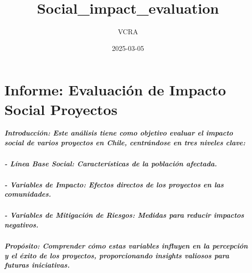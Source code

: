 \documentclass[
]{article}
\title{Social\_impact\_evaluation}
\author{VCRA}
\date{2025-03-05}
\begin{document}
\maketitle

\section{\texorpdfstring{\textbf{Informe: Evaluación de Impacto Social
Proyectos}}{Informe: Evaluación de Impacto Social Proyectos}}\label{informe-evaluaciuxf3n-de-impacto-social-proyectos}

\subparagraph{\texorpdfstring{\textbf{Introducción}: Este análisis tiene
como objetivo evaluar el impacto social de varios proyectos en Chile,
centrándose en tres niveles
clave:}{Introducción: Este análisis tiene como objetivo evaluar el impacto social de varios proyectos en Chile, centrándose en tres niveles clave:}}\label{introducciuxf3n-este-anuxe1lisis-tiene-como-objetivo-evaluar-el-impacto-social-de-varios-proyectos-en-chile-centruxe1ndose-en-tres-niveles-clave}

\subparagraph{\texorpdfstring{- \textbf{Línea Base Social}:
Características de la población
afectada.}{- Línea Base Social: Características de la población afectada.}}\label{luxednea-base-social-caracteruxedsticas-de-la-poblaciuxf3n-afectada.}

\subparagraph{\texorpdfstring{- \textbf{Variables de Impacto}: Efectos
directos de los proyectos en las
comunidades.}{- Variables de Impacto: Efectos directos de los proyectos en las comunidades.}}\label{variables-de-impacto-efectos-directos-de-los-proyectos-en-las-comunidades.}

\subparagraph{\texorpdfstring{- \textbf{Variables de Mitigación de
Riesgos}: Medidas para reducir impactos
negativos.}{- Variables de Mitigación de Riesgos: Medidas para reducir impactos negativos.}}\label{variables-de-mitigaciuxf3n-de-riesgos-medidas-para-reducir-impactos-negativos.}

\subparagraph{\texorpdfstring{\textbf{Propósito}: Comprender cómo estas
variables influyen en la percepción y el éxito de los proyectos,
proporcionando insights valiosos para futuras
iniciativas.}{Propósito: Comprender cómo estas variables influyen en la percepción y el éxito de los proyectos, proporcionando insights valiosos para futuras iniciativas.}}\label{propuxf3sito-comprender-cuxf3mo-estas-variables-influyen-en-la-percepciuxf3n-y-el-uxe9xito-de-los-proyectos-proporcionando-insights-valiosos-para-futuras-iniciativas.}
\end{document}
